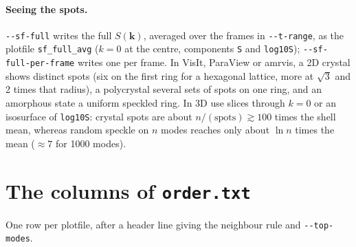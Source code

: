 \documentclass[11pt]{article}
\newcommand{\code}[1]{\texttt{#1}}
\begin{document}
\paragraph{Seeing the spots.} \code{-{}-sf-full} writes the full
$S(\mathbf k)$, averaged over the frames in \code{-{}-t-range}, as the plotfile
\code{sf\_full\_avg} ($k=0$ at the centre, components \code{S} and
\code{log10S}); \code{-{}-sf-full-per-frame} writes one per frame. In VisIt,
ParaView or amrvis, a 2D crystal shows distinct spots (six on the first ring
for a hexagonal lattice, more at $\sqrt3$ and 2 times that radius), a
polycrystal several sets of spots on one ring, and an amorphous state a
uniform speckled ring. In 3D use slices through $k=0$ or an isosurface of
\code{log10S}: crystal spots are about $n/(\text{spots})\gtrsim100$ times the
shell mean, whereas random speckle on $n$ modes reaches only about $\ln n$
times the mean ($\approx7$ for 1000 modes).


\section{\texorpdfstring{The columns of \code{order.txt}}{The columns of order.txt}}
One row per plotfile, after a header line giving the neighbour rule and
\code{-{}-top-modes}.
\end{document}
